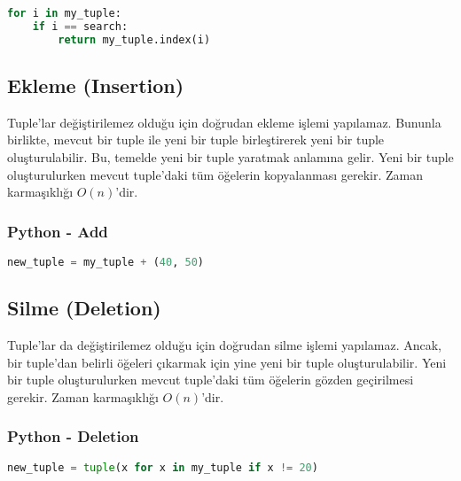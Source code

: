 \begin{lstlisting}[language=Python]
for i in my_tuple:
    if i == search:
        return my_tuple.index(i)
\end{lstlisting}

\subsection{Ekleme (Insertion)}

Tuple'lar değiştirilemez olduğu için doğrudan ekleme işlemi yapılamaz. Bununla birlikte, mevcut bir tuple ile yeni bir tuple birleştirerek yeni bir tuple oluşturulabilir. Bu, temelde yeni bir tuple yaratmak anlamına gelir. Yeni bir tuple oluşturulurken mevcut tuple'daki tüm öğelerin kopyalanması gerekir. Zaman karmaşıklığı $O(n)$'dir.

\subsubsection{Python - Add}

\begin{lstlisting}[language=Python]
new_tuple = my_tuple + (40, 50)
\end{lstlisting}

\subsection{Silme (Deletion)}

Tuple'lar da değiştirilemez olduğu için doğrudan silme işlemi yapılamaz. Ancak, bir tuple'dan belirli öğeleri çıkarmak için yine yeni bir tuple oluşturulabilir. Yeni bir tuple oluşturulurken mevcut tuple'daki tüm öğelerin gözden geçirilmesi gerekir. Zaman karmaşıklığı $O(n)$'dir.

\subsubsection{Python - Deletion}

\begin{lstlisting}[language=Python]
new_tuple = tuple(x for x in my_tuple if x != 20)
\end{lstlisting}

\newpage